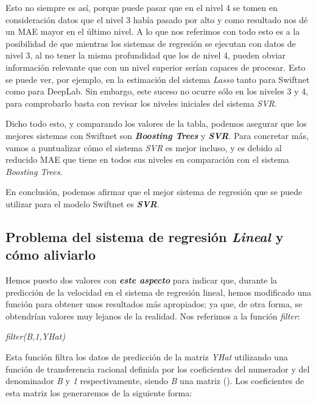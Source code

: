 Esto no siempre es así, porque puede pasar que en el nivel 4 se tomen en consideración datos que el nivel 3 había pasado por alto y como resultado nos dé un \ac{MAE} mayor en el último nivel. A lo que nos referimos con todo esto es a la posibilidad de que mientras los sistemas de regresión se ejecutan con datos de nivel 3, al no tener la misma profundidad que los de nivel 4, pueden obviar información relevante que con un nivel superior serían capaces de procesar. Esto se puede ver, por ejemplo, en la estimación del sistema \textit{Lasso} tanto para Swiftnet como para DeepLab. Sin embargo, este suceso no ocurre sólo en los niveles 3 y 4, para comprobarlo basta con revisar los niveles iniciales del sistema \textit{\ac{SVR}}.

Dicho todo esto, y comparando los valores de la tabla, podemos asegurar que los mejores sistemas con Swiftnet son \textbf{\textit{Boosting Trees}} y \textbf{\textit{\ac{SVR}}}. Para concretar más, vamos a puntualizar cómo el sistema \textit{\ac{SVR}} es mejor incluso, y es debido al reducido \ac{MAE} que tiene en todos sus niveles en comparación con el sistema \textit{Boosting Trees}.

En conclusión, podemos afirmar que el mejor sistema de regresión que se puede utilizar para el modelo Swiftnet es \textbf{\textit{\ac{SVR}}}.

\subsection{Problema del sistema de regresión \textit{Lineal} y cómo aliviarlo}

Hemos puesto dos valores con \textit{\textbf{este aspecto}} para indicar que, durante la predicción de la velocidad en el sistema de regresión lineal, hemos modificado una función para obtener unos resultados más apropiados; ya que, de otra forma, se obtendrían valores muy lejanos de la realidad. Nos referimos a la función \textit{filter}:

\begin{center}
\textit{filter(B,1,YHat)}
\end{center}

Esta función filtra los datos de predicción de la matriz \textit{YHat} utilizando una función de transferencia racional definida por los coeficientes del numerador y del denominador \textit{B} y \textit{1} respectivamente, siendo \textit{B} una matriz (\cite{filter}). Los coeficientes de esta matriz los generaremos de la siguiente forma:

